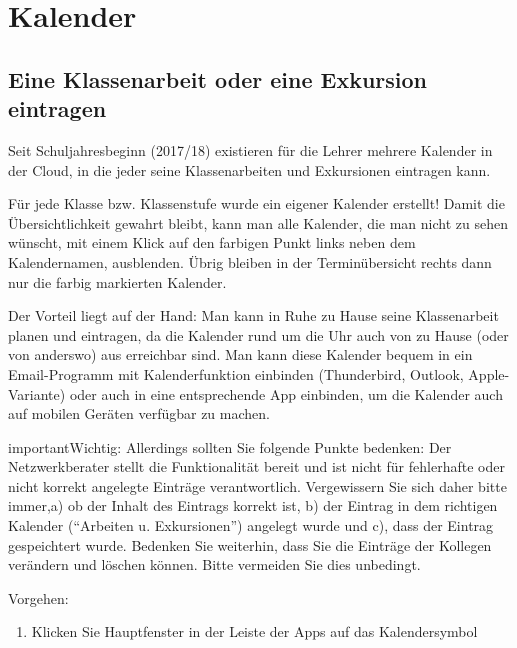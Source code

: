 \documentclass[letterpaper,10pt,ngerman]{sphinxmanual}
\begin{document}
\chapter{Kalender}
\label{Kalender::doc}\label{Kalender:kalender}

\section{Eine Klassenarbeit oder eine Exkursion eintragen}
\label{Kalender:kalender-sk}\label{Kalender:eine-klassenarbeit-oder-eine-exkursion-eintragen}
Seit Schuljahresbeginn (2017/18) existieren für die Lehrer mehrere Kalender in der Cloud, in die jeder seine Klassenarbeiten und Exkursionen
eintragen kann.

Für jede Klasse bzw. Klassenstufe wurde ein eigener Kalender erstellt! Damit die Übersichtlichkeit gewahrt bleibt, kann man alle Kalender, die man nicht zu sehen wünscht, mit einem Klick
auf den farbigen Punkt links neben dem Kalendernamen, ausblenden. Übrig bleiben in der Terminübersicht rechts dann nur die farbig markierten Kalender.

Der Vorteil liegt auf der Hand: Man kann in Ruhe zu Hause seine Klassenarbeit planen und eintragen, da die Kalender rund um die Uhr auch von
zu Hause (oder von anderswo) aus erreichbar sind. Man kann diese Kalender bequem in ein Email-Programm mit Kalenderfunktion einbinden (Thunderbird, Outlook, Apple-Variante)
oder auch in eine entsprechende App einbinden, um die Kalender auch auf mobilen Geräten verfügbar zu machen.

\begin{notice}{important}{Wichtig:}
Allerdings sollten Sie folgende Punkte bedenken:  Der Netzwerkberater stellt die Funktionalität bereit und ist nicht für fehlerhafte oder nicht korrekt angelegte Einträge verantwortlich. Vergewissern Sie sich daher bitte immer,a) ob der Inhalt des Eintrags korrekt ist, b) der Eintrag in dem richtigen Kalender (``Arbeiten u. Exkursionen'') angelegt wurde und c), dass der Eintrag gespeichtert wurde. Bedenken Sie weiterhin, dass Sie die Einträge der Kollegen verändern und löschen können. Bitte vermeiden Sie dies unbedingt.
\end{notice}

Vorgehen:
\begin{enumerate}
\item {} 
Klicken Sie Hauptfenster in der Leiste der Apps auf das Kalendersymbol

\end{enumerate}
\end{document}
